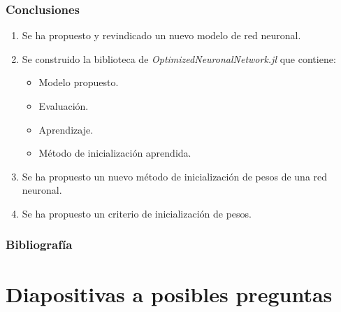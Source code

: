 \documentclass{beamer}
\begin{document}
\begin{frame}
    \frametitle{Conclusiones}
    \begin{enumerate}
        \item Se ha propuesto y revindicado un nuevo modelo de red neuronal.
        \item Se construido la biblioteca de \textit{OptimizedNeuronalNetwork.jl} que contiene: 
        \begin{itemize}
            \item Modelo propuesto. 
            \item Evaluación.
            \item Aprendizaje. 
            \item Método de inicialización aprendida. 
        \end{itemize}
        \item Se ha propuesto un nuevo método de inicialización de pesos de una red neuronal. 
        \item Se ha propuesto un criterio de inicialización de pesos. 
    \end{enumerate}
    
\end{frame}

\begin{frame}
    \frametitle{Bibliografía}
    \printbibliography
    
\end{frame}

\section*{Diapositivas a posibles preguntas}
\end{document}
